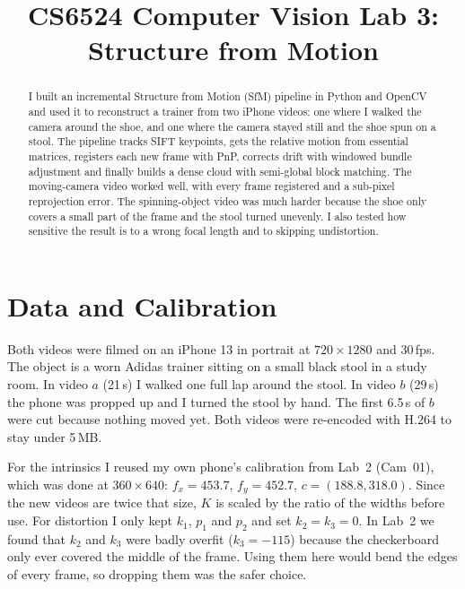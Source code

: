 \documentclass[conference]{assets/latex/IEEEtran}
\begin{document}
\title{CS6524 Computer Vision Lab 3:\\ Structure from Motion}

\author{
}

\maketitle

\begin{abstract}
I built an incremental Structure from Motion (SfM) pipeline in Python and OpenCV and used it to
reconstruct a trainer from two iPhone videos: one where I walked the camera around the shoe, and
one where the camera stayed still and the shoe spun on a stool. The pipeline tracks SIFT
keypoints, gets the relative motion from essential matrices, registers each new frame with PnP,
corrects drift with windowed bundle adjustment and finally builds a dense cloud with
semi-global block matching. The moving-camera video worked well, with every frame registered and
a sub-pixel reprojection error. The spinning-object video was much harder because the shoe only
covers a small part of the frame and the stool turned unevenly. I also tested how sensitive the
result is to a wrong focal length and to skipping undistortion.
\end{abstract}

\section{Data and Calibration}

Both videos were filmed on an iPhone 13 in portrait at $720\times1280$ and 30\,fps. The object
is a worn Adidas trainer sitting on a small black stool in a study room. In video $a$ (21\,s) I
walked one full lap around the stool. In video $b$ (29\,s) the phone was propped up and I turned
the stool by hand. The first 6.5\,s of $b$ were cut because nothing moved yet. Both videos were
re-encoded with H.264 to stay under 5\,MB.

For the intrinsics I reused my own phone's calibration from Lab~2 (Cam~01), which was done at
$360\times640$: $f_x=453.7$, $f_y=452.7$, $c=(188.8, 318.0)$. Since the new videos are twice that
size, $K$ is scaled by the ratio of the widths before use. For distortion I only kept $k_1$,
$p_1$ and $p_2$ and set $k_2=k_3=0$. In Lab~2 we found that $k_2$ and $k_3$ were badly overfit
($k_3=-115$) because the checkerboard only ever covered the middle of the frame. Using them here
would bend the edges of every frame, so dropping them was the safer choice.
\end{document}
